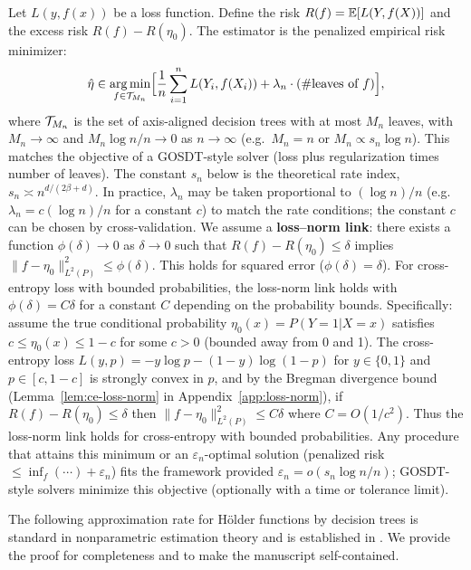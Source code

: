 \documentclass[12pt]{article}
\begin{document}
Let $L(y, f(x))$ be a loss function. Define the risk $R(f) = \mathbb{E}[L(Y, f(X))]$ and the excess risk $R(f) - R(\eta_0)$. The estimator is the penalized empirical risk minimizer:
\begin{equation}
\label{eq:perm}
\hat\eta \in \operatorname*{arg\,min}_{f \in \mathcal{T}_{M_n}} \Bigl[ \frac{1}{n}\sum_{i=1}^n L(Y_i, f(X_i)) + \lambda_n \cdot (\#\text{leaves of } f) \Bigr],
\end{equation}
where $\mathcal{T}_{M_n}$ is the set of axis-aligned decision trees with at most $M_n$ leaves, with $M_n \to \infty$ and $M_n \log n / n \to 0$ as $n \to \infty$ (e.g.\ $M_n = n$ or $M_n \propto s_n \log n$). This matches the objective of a GOSDT-style solver (loss plus regularization times number of leaves). The constant $s_n$ below is the theoretical rate index, $s_n \asymp n^{d/(2\beta+d)}$. In practice, $\lambda_n$ may be taken proportional to $(\log n)/n$ (e.g.\ $\lambda_n = c (\log n)/n$ for a constant $c$) to match the rate conditions; the constant $c$ can be chosen by cross-validation. We assume a \textbf{loss--norm link}: there exists a function $\phi(\delta) \to 0$ as $\delta \to 0$ such that $R(f) - R(\eta_0) \le \delta$ implies $\|f - \eta_0\|_{L^2(P)}^2 \le \phi(\delta)$. This holds for squared error ($\phi(\delta)=\delta$). For cross-entropy loss with bounded probabilities, the loss-norm link holds with $\phi(\delta) = C\delta$ for a constant $C$ depending on the probability bounds. Specifically: assume the true conditional probability $\eta_0(x) = P(Y=1|X=x)$ satisfies $c \le \eta_0(x) \le 1-c$ for some $c > 0$ (bounded away from 0 and 1). The cross-entropy loss $L(y, p) = -y \log p - (1-y) \log(1-p)$ for $y \in \{0,1\}$ and $p \in [c, 1-c]$ is strongly convex in $p$, and by the Bregman divergence bound (Lemma~\ref{lem:ce-loss-norm} in Appendix~\ref{app:loss-norm}), if $R(f) - R(\eta_0) \le \delta$ then $\|f - \eta_0\|_{L^2(P)}^2 \le C\delta$ where $C = O(1/c^2)$. Thus the loss-norm link holds for cross-entropy with bounded probabilities. Any procedure that attains this minimum or an $\varepsilon_n$-optimal solution (penalized risk $\le \inf_f (\cdots) + \varepsilon_n$) fits the framework provided $\varepsilon_n = o(s_n \log n / n)$; GOSDT-style solvers minimize this objective (optionally with a time or tolerance limit).

The following approximation rate for Hölder functions by decision trees is standard in nonparametric estimation theory and is established in \citet{xuStatisticalOptimalityOptimal2026}. We provide the proof for completeness and to make the manuscript self-contained.
\end{document}
